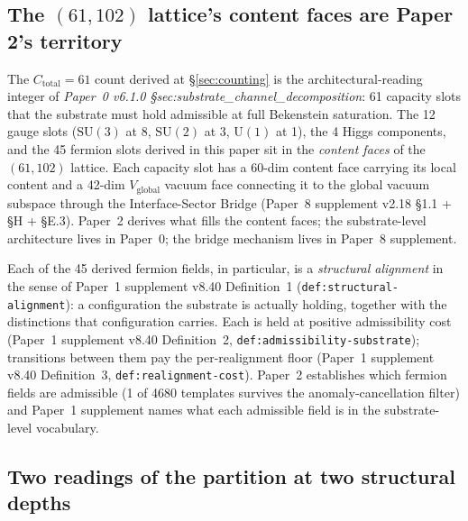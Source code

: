 \documentclass[11pt]{article}
\begin{document}
\subsection{The $(61, 102)$ lattice's content faces are Paper 2's territory}\label{sec:substrate-level-reading-faces}

The $C_{\mathrm{total}} = 61$ count derived at \S\ref{sec:counting} is the architectural-reading integer of \emph{Paper~0 v6.1.0 \S sec:substrate\_channel\_decomposition}: 61 capacity slots that the substrate must hold admissible at full Bekenstein saturation. The 12 gauge slots ($\mathrm{SU}(3)$ at 8, $\mathrm{SU}(2)$ at 3, $\mathrm{U}(1)$ at 1), the 4 Higgs components, and the 45 fermion slots derived in this paper sit in the \emph{content faces} of the $(61, 102)$ lattice. Each capacity slot has a 60-dim content face carrying its local content and a 42-dim $V_{\mathrm{global}}$ vacuum face connecting it to the global vacuum subspace through the Interface-Sector Bridge (Paper~8 supplement v2.18 \S 1.1 + \S H + \S E.3). Paper~2 derives what fills the content faces; the substrate-level architecture lives in Paper~0; the bridge mechanism lives in Paper~8 supplement.

Each of the 45 derived fermion fields, in particular, is a \emph{structural alignment} in the sense of Paper~1 supplement v8.40 Definition~1 (\texttt{def:structural-alignment}): a configuration the substrate is actually holding, together with the distinctions that configuration carries. Each is held at positive admissibility cost (Paper~1 supplement v8.40 Definition~2, \texttt{def:admissibility-substrate}); transitions between them pay the per-realignment floor (Paper~1 supplement v8.40 Definition~3, \texttt{def:realignment-cost}). Paper~2 establishes which fermion fields are admissible (1 of 4680 templates survives the anomaly-cancellation filter) and Paper~1 supplement names what each admissible field is in the substrate-level vocabulary.

\subsection{Two readings of the partition at two structural depths}\label{sec:substrate-level-reading-two-readings}
\end{document}
